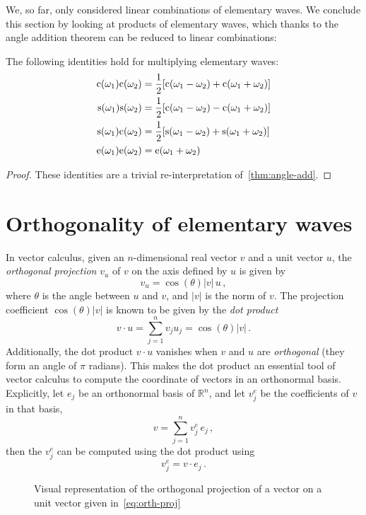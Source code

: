 We, so far, only considered linear combinations of elementary waves. We conclude this
section by looking at products of elementary waves, which thanks to the angle addition
theorem can be reduced to linear combinations:
\begin{proposition}
  The following identities hold for multiplying elementary waves:
  \begin{align}
    \mathrm{c}(\omega_1)\mathrm{c}(\omega_2)&=\frac{1}{2}[\mathrm{c}(\omega_1-\omega_2)+\mathrm{c}(\omega_1+\omega_2)]
    \label{eq:cprod}\\
    \mathrm{s}(\omega_1)\mathrm{s}(\omega_2)&=\frac{1}{2}[\mathrm{c}(\omega_1-\omega_2)-\mathrm{c}(\omega_1+\omega_2)]
    \label{eq:sprod}\\
    \mathrm{s}(\omega_1)\mathrm{c}(\omega_2)&=\frac{1}{2}[\mathrm{s}(\omega_1-\omega_2)+\mathrm{s}(\omega_1+\omega_2)]
    \label{eq:scprod}\\
    \mathrm{e}(\omega_1)\mathrm{e}(\omega_2)&=\mathrm{e}(\omega_1+\omega_2)\label{eq:eprod}
  \end{align}
\end{proposition}
\begin{proof}
  These identities are a trivial re-interpretation of~\cref{thm:angle-add}.
\end{proof}
\section{Orthogonality of elementary waves}
In vector calculus, given an $n$-dimensional real vector $v$ and a unit vector $u$, the
\emph{orthogonal projection} $v_u$ of $v$ on the axis defined by $u$ is given by
\begin{equation}
  \label{eq:orth-proj}
  v_u=\cos(\theta)|v|\,u\,,
\end{equation}
where $\theta$ is the angle between $u$ and $v$, and $|v|$ is the norm of $v$. The
projection coefficient $\cos(\theta)|v|$ is known to be given by the \emph{dot product}
\begin{equation}
  v\cdot u=\sum_{j=1}^n v_j u_j=\cos(\theta)|v|\,.\label{eq:vec-dot}
\end{equation}
Additionally, the dot product $v\cdot u$ vanishes when $v$ and $u$ are \emph{orthogonal}
(\ie they form an angle of $\pi$ radians). This makes the dot product an essential tool of
vector calculus to compute the coordinate of vectors in an orthonormal basis. Explicitly,
let $e_j$ be an orthonormal basis of $\mathbb{R}^n$, and let $v^{e}_j$ be the coefficients
of $v$ in that basis, \ie
\begin{equation}
  v=\sum_{j=1}^{n}v^{e}_j\,e_j\,,
\end{equation}
then the $v^{e}_j$ can be computed using the dot product using
\begin{equation}
  v^{e}_j=v\cdot e_j\,.\label{eq:basis-proj}
\end{equation}
\begin{figure}[t]
  \caption{Visual representation of the orthogonal projection of a vector on a unit vector
  given in~\cref{eq:orth-proj}}
  \label{fig:orth-proj}
\end{figure}

